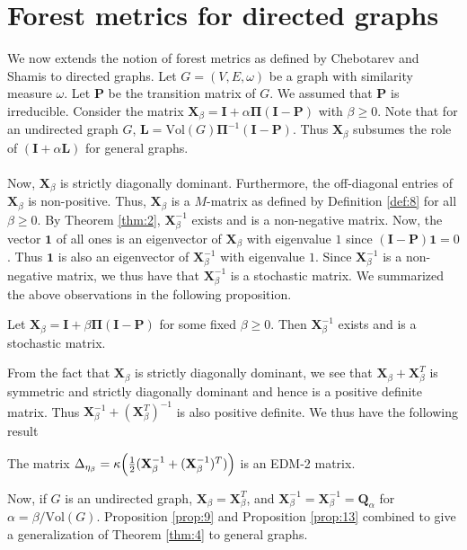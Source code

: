 \section{Forest metrics for directed graphs}
\label{sec:forest-metr-direct}
We now extends the notion of forest metrics as defined by Chebotarev
and Shamis to directed graphs. Let $G = (V,E,\omega)$ be a graph with
similarity measure $\omega$. Let $\mathbf{P}$ be the transition matrix
of $G$. We assumed that $\mathbf{P}$ is irreducible. Consider the
matrix $\mathbf{X}_{\beta} = \mathbf{I} + \alpha \bm{\Pi}(\mathbf{I} -
\mathbf{P})$ with $\beta \geq 0$. Note that for an undirected graph
$G$, $\mathbf{L} = \mathrm{Vol}(G) \bm{\Pi}^{-1}(\mathbf{I} -
\mathbf{P})$. Thus $\mathbf{X}_{\beta}$ subsumes the role of
$(\mathbf{I} + \alpha \mathbf{L})$ for general graphs. \\ \\
%
%
\noindent Now, $\mathbf{X}_{\beta}$ is strictly diagonally dominant. Furthermore, the
off-diagonal entries of $\mathbf{X}_{\beta}$ is non-positive. Thus,
$\mathbf{X}_{\beta}$ is a $M$-matrix as defined by Definition
\ref{def:8} for all $\beta \geq 0$. By
Theorem \ref{thm:2}, $\mathbf{X}_{\beta}^{-1}$ exists and is a non-negative
matrix. Now, the vector $\bm{1}$ of all ones is an eigenvector of
$\mathbf{X}_{\beta}$ with eigenvalue $1$ since $(\mathbf{I} -
\mathbf{P})\bm{1} = 0$. Thus $\bm{1}$ is also an eigenvector of
$\mathbf{X}_{\beta}^{-1}$ with eigenvalue $1$. Since
$\mathbf{X}_{\beta}^{-1}$ is a
non-negative matrix, we thus have that $\mathbf{X}_{\beta}^{-1}$ is a
stochastic matrix. We summarized the above observations in the
following proposition.  
\begin{proposition}
  \label{prop:9}
  Let $\mathbf{X}_{\beta} = \mathbf{I} + \beta \bm{\Pi}(\mathbf{I} -
  \mathbf{P})$ for some fixed $\beta \geq 0$. Then
  $\mathbf{X}_{\beta}^{-1}$ exists and is a stochastic
  matrix. 
\end{proposition}
From the fact that $\mathbf{X}_{\beta}$ is strictly diagonally dominant, we
see that $\mathbf{X}_{\beta} + \mathbf{X}_{\beta}^{T}$ is symmetric and strictly
diagonally dominant and hence is a positive definite matrix. Thus
$\mathbf{X}_{\beta}^{-1} + (\mathbf{X}_{\beta}^{T})^{-1}$ is also positive definite. 
We thus have the following result 
\begin{proposition}
  \label{prop:13}
  The matrix $\Delta_{\eta_{\beta}} =
  \kappa\Bigl(\tfrac{1}{2}(\mathbf{X}_{\beta}^{-1} +
  (\mathbf{X}_{\beta}^{-1})^{T})\Bigr)$ is an EDM-2 matrix. 
\end{proposition}
Now, if $G$ is an undirected graph, $\mathbf{X}_{\beta} =
\mathbf{X}_{\beta}^{T}$, and $\mathbf{X}_{\beta}^{-1} =
\mathbf{X}_{\beta}^{-1} = \mathbf{Q}_{\alpha}$ for $\alpha =
\beta/\mathrm{Vol}(G)$. Proposition \ref{prop:9} and Proposition
\ref{prop:13} combined to give a generalization of Theorem \ref{thm:4}
to general graphs. 

